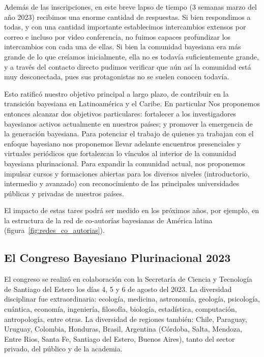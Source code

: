 \documentclass[a4paper,11pt]{book}
\theoremstyle{definition}
\begin{document}

Además de las inscripciones, en este breve lapso de tiempo (3 semanas marzo del año 2023) recibimos una enorme cantidad de respuestas.
%
Si bien respondimos a todas, y con una cantidad importante establecimos intercambios extensos por correo e incluso por video conferencia, no fuimos capaces profundizar los intercambios con cada una de ellas.
%
Si bien la comunidad bayesiana era más grande de lo que creíamos inicialmente, ella no es todavía suficientemente grande, y a través del contacto directo pudimos verificar que aún así la comunidad está muy desconectada, pues sus protagonistas no se suelen conocen todavía.


Esto ratificó nuestro objetivo principal a largo plazo, de contribuir en la transición bayesiana en Latinoamérica y el Caribe.
%
En particular Nos proponemos entonces alcanzar dos objetivos particulares: fortalecer a los investigadores bayesianos activos actualmente en nuestros países; y promover la emergencia de la generación bayesiana.
%
Para potenciar el trabajo de quienes ya trabajan con el enfoque bayesiano nos proponemos llevar adelante encuentros presenciales y virtuales periódicos que fortalezcan lo vínculos al interior de la comunidad bayesiana plurinacional.
%
Para expandir la comunidad actual, nos proponemos impulsar cursos y formaciones abiertas para los diversos niveles (introductorio, intermedio y avanzado) con reconocimiento de las principales universidades públicas y privadas de nuestros países.


El impacto de estas tares podrá ser medido en los próximos años, por ejemplo, en la estructura de la red de co-autorías bayesianas de América latina (figura~\ref{fig:redes_co_autorias}).


\subsection{El Congreso Bayesiano Plurinacional 2023}


El congreso se realizó en colaboración con la Secretaría de Ciencia y Tecnología de Santiago del Estero los días 4, 5 y 6 de agosto del 2023.
%
La diversidad disciplinar fue extraordinaria: ecología, medicina, astronomía, geología, psicología, cuántica, economía, ingeniería, filosofía, biología, estadística, computación, antropología, entre otras.
%
La diversidad de regiones también: Chile, Paraguay, Uruguay, Colombia, Honduras, Brasil, Argentina (Córdoba, Salta, Mendoza, Entre Rios, Santa Fe, Santiago del Estero, Buenos Aires), tanto del sector privado, del público y de la academia.
\end{document}
